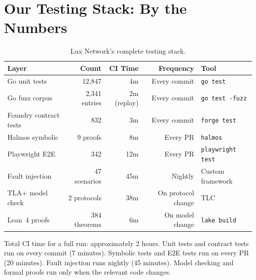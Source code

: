 \section{Our Testing Stack: By the Numbers}


\begin{table}[H]
\centering
\small
\begin{tabular}{@{}lrrrl@{}}
\toprule
\textbf{Layer} & \textbf{Count} & \textbf{CI Time} & \textbf{Frequency} & \textbf{Tool} \\
\midrule
Go unit tests & 12,847 & 4m & Every commit & \texttt{go test} \\
Go fuzz corpus & 2,341 entries & 2m (replay) & Every commit & \texttt{go test -fuzz} \\
Foundry contract tests & 832 & 3m & Every commit & \texttt{forge test} \\
Halmos symbolic & 9 proofs & 8m & Every PR & \texttt{halmos} \\
Playwright E2E & 342 & 12m & Every PR & \texttt{playwright test} \\
Fault injection & 47 scenarios & 45m & Nightly & Custom framework \\
TLA+ model check & 2 protocols & 38m & On protocol change & TLC \\
Lean~4 proofs & 384 theorems & 6m & On model change & \texttt{lake build} \\
\bottomrule
\end{tabular}
\caption{Lux Network's complete testing stack.}
\end{table}

Total CI time for a full run: approximately 2 hours. Unit tests and contract tests run
on every commit (7 minutes). Symbolic tests and E2E tests run on every PR (20 minutes).
Fault injection runs nightly (45 minutes). Model checking and formal proofs run only
when the relevant code changes.

